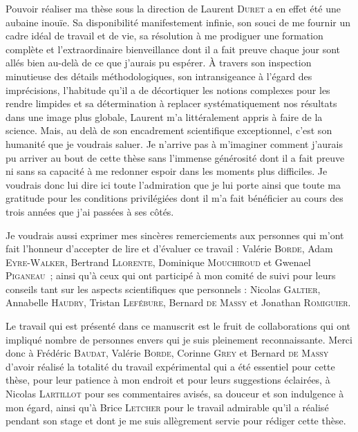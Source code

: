 Pouvoir réaliser ma thèse sous la direction de Laurent \textsc{Duret} a en effet été une aubaine inouïe.
Sa disponibilité manifestement infinie, son souci de me fournir un cadre idéal de travail et de vie, sa résolution à me prodiguer une formation complète et l'extraordinaire bienveillance dont il a fait preuve chaque jour sont allés bien au-delà de ce que j'aurais pu espérer.
\`A travers son inspection minutieuse des détails méthodologiques, son intransigeance à l'égard des imprécisions, l'habitude qu'il a de décortiquer les notions complexes pour les rendre limpides 
et sa détermination à replacer systématiquement nos résultats dans une image plus globale, Laurent m'a littéralement appris à faire de la science.
Mais, au delà de son encadrement scientifique exceptionnel, c'est son humanité que je voudrais saluer.
Je n'arrive pas à m'imaginer comment j'aurais pu arriver au bout de cette thèse sans l'immense générosité dont il a fait preuve ni sans sa capacité à me redonner espoir dans les moments plus difficiles.
Je voudrais donc lui dire ici toute l'admiration que je lui porte ainsi que toute ma gratitude pour les conditions privilégiées dont il m'a fait bénéficier au cours des trois années que j'ai passées à ses côtés.

Je voudrais aussi exprimer mes sincères remerciements aux personnes qui m'ont fait l'honneur d'accepter de lire et d'évaluer ce travail : Valérie \textsc{Borde}, Adam \textsc{Eyre-Walker}, Bertrand \textsc{Llorente}, Dominique \textsc{Mouchiroud} et Gwenael \textsc{Piganeau}~;
ainsi qu'à ceux qui ont participé à mon comité de suivi pour leurs conseils tant sur les aspects scientifiques que personnels : 
Nicolas \textsc{Galtier},
Annabelle \textsc{Haudry},
Tristan \textsc{Lefébure},
Bernard \textsc{de Massy} et
Jonathan \textsc{Romiguier}.


Le travail qui est présenté dans ce manuscrit est le fruit de collaborations qui ont impliqué nombre de personnes envers qui je suis pleinement reconnaissante.
Merci donc à Frédéric \textsc{Baudat}, Valérie \textsc{Borde}, Corinne \textsc{Grey} et Bernard \textsc{de Massy} d'avoir réalisé la totalité du travail expérimental qui a été essentiel pour cette thèse, pour leur patience à mon endroit et pour leurs suggestions éclairées,
à Nicolas \textsc{Lartillot} pour ses commentaires avisés, sa douceur et son indulgence à mon égard, ainsi qu'à Brice \textsc{Letcher} pour le travail admirable qu'il a réalisé pendant son stage et dont je me suis allègrement servie pour rédiger cette thèse.\\



